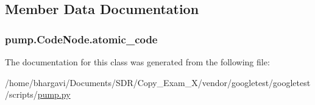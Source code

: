 \subsection{Member Data Documentation}
\subsubsection[{\texorpdfstring{atomic\+\_\+code}{atomic_code}}]{\setlength{\rightskip}{0pt plus 5cm}pump.\+Code\+Node.\+atomic\+\_\+code}\hypertarget{classpump_1_1_code_node_ac7251110cc987c709e0e17d95521993e}{}\label{classpump_1_1_code_node_ac7251110cc987c709e0e17d95521993e}


The documentation for this class was generated from the following file\+:\begin{DoxyCompactItemize}
\item 
/home/bhargavi/\+Documents/\+S\+D\+R/\+Copy\+\_\+\+Exam\+\_\+X/vendor/googletest/googletest/scripts/\hyperlink{pump_8py}{pump.\+py}\end{DoxyCompactItemize}
